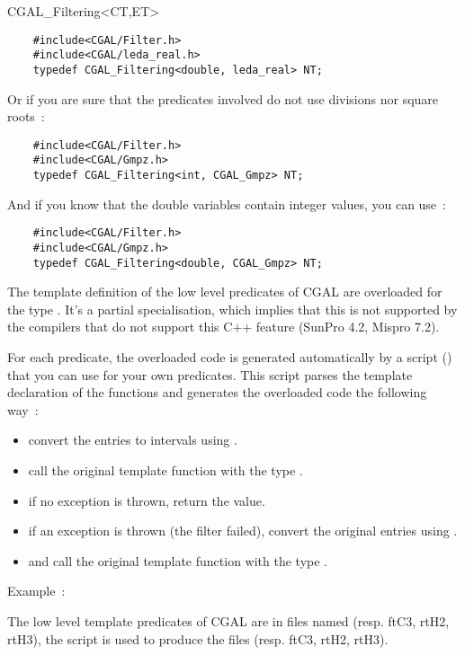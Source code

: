 \begin{ccClass} {CGAL_Filtering<CT,ET>}
\begin{verbatim}
    #include<CGAL/Filter.h>
    #include<CGAL/leda_real.h>
    typedef CGAL_Filtering<double, leda_real> NT;
\end{verbatim}

Or if you are sure that the predicates involved do not use divisions nor
square roots~:

\begin{verbatim}
    #include<CGAL/Filter.h>
    #include<CGAL/Gmpz.h>
    typedef CGAL_Filtering<int, CGAL_Gmpz> NT;
\end{verbatim}

And if you know that the double variables contain integer values, you can
use~:

\begin{verbatim}
    #include<CGAL/Filter.h>
    #include<CGAL/Gmpz.h>
    typedef CGAL_Filtering<double, CGAL_Gmpz> NT;
\end{verbatim}

\ccImplementation

The template definition of the low level predicates of CGAL are overloaded for
the type .  It's a partial specialisation, which
implies that this is not supported by the compilers that do not support this
C++ feature (SunPro 4.2, Mispro 7.2).

For each predicate, the overloaded code is generated automatically by a script
() that you can
use for your own predicates.  This script parses the template declaration of
the functions and generates the overloaded code the following way~:
\begin{itemize}
\item convert the entries to intervals using
    .
\item call the original template function with the type
    .
\item if no exception is thrown, return the value.
\item if an exception is thrown (the filter failed), convert the original
    entries using .
\item and call the original template function with the type .
\end{itemize}

Example~:

The low level template predicates of CGAL are in files named
 (resp. ftC3, rtH2, rtH3), the script is used
to produce the files  (resp. ftC3, rtH2,
rtH3).

\end{ccClass}
